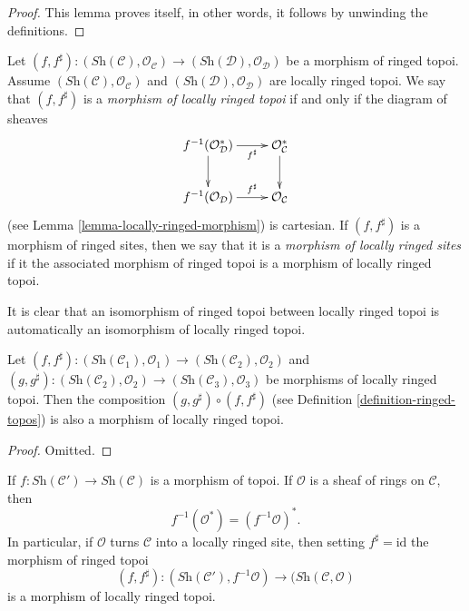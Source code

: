 \begin{proof}
This lemma proves itself, in other words, it follows by unwinding the
definitions.
\end{proof}

\begin{definition}
\label{definition-morphism-locally-ringed-topoi}
Let $(f, f^\sharp) : (\textit{Sh}(\mathcal{C}), \mathcal{O}_{\mathcal{C}})
\to (\textit{Sh}(\mathcal{D}), \mathcal{O}_{\mathcal{D}})$
be a morphism of ringed topoi. Assume
$(\textit{Sh}(\mathcal{C}), \mathcal{O}_{\mathcal{C}})$
and
$(\textit{Sh}(\mathcal{D}), \mathcal{O}_{\mathcal{D}})$
are locally ringed topoi. We say that $(f, f^\sharp)$ is a
{\it morphism of locally ringed topoi} if and only if the
diagram of sheaves
$$
\xymatrix{
f^{-1}(\mathcal{O}^*_{\mathcal{D}}) \ar[r]_-{f^\sharp} \ar[d] &
\mathcal{O}^*_{\mathcal{C}} \ar[d] \\
f^{-1}(\mathcal{O}_{\mathcal{D}}) \ar[r]^-{f^\sharp} &
\mathcal{O}_{\mathcal{C}}
}
$$
(see
Lemma \ref{lemma-locally-ringed-morphism})
is cartesian. If $(f, f^\sharp)$ is a morphism of ringed sites, then
we say that it is a {\it morphism of locally ringed sites} if it
the associated morphism of ringed topoi is a morphism of locally ringed
topoi.
\end{definition}

\noindent
It is clear that an isomorphism of ringed topoi between locally ringed
topoi is automatically an isomorphism of locally ringed topoi.

\begin{lemma}
\label{lemma-composition-morphisms-locally-ringed-topoi}
Let
$(f, f^\sharp) :
(\textit{Sh}(\mathcal{C}_1), \mathcal{O}_1)
\to (\textit{Sh}(\mathcal{C}_2), \mathcal{O}_2)$ and
$(g, g^\sharp) :
(\textit{Sh}(\mathcal{C}_2), \mathcal{O}_2) \to
(\textit{Sh}(\mathcal{C}_3), \mathcal{O}_3)$
be morphisms of locally ringed topoi. Then the composition
$(g, g^\sharp) \circ (f, f^\sharp)$ (see
Definition \ref{definition-ringed-topos})
is also a morphism of locally ringed topoi.
\end{lemma}

\begin{proof}
Omitted.
\end{proof}

\begin{lemma}
\label{lemma-locally-ringed-intrinsic-morphism}
If $f : \textit{Sh}(\mathcal{C}') \to \textit{Sh}(\mathcal{C})$
is a morphism of topoi. If $\mathcal{O}$ is a sheaf of rings
on $\mathcal{C}$, then
$$
f^{-1}(\mathcal{O}^*) = (f^{-1}\mathcal{O})^*.
$$
In particular, if $\mathcal{O}$ turns $\mathcal{C}$ into a locally
ringed site, then setting $f^\sharp = \text{id}$
the morphism of ringed topoi
$$
(f, f^\sharp) :
(\textit{Sh}(\mathcal{C}'), f^{-1}\mathcal{O})
\to
(\textit{Sh}(\mathcal{C}, \mathcal{O})
$$
is a morphism of locally ringed topoi.
\end{lemma}

